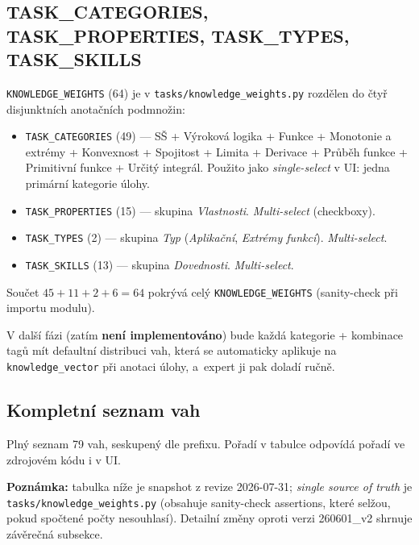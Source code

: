\documentclass[11pt,a4paper]{article}
\begin{document}
\subsection{TASK\_CATEGORIES, TASK\_PROPERTIES, TASK\_TYPES, TASK\_SKILLS}

\texttt{KNOWLEDGE\_WEIGHTS} (64) je v \texttt{tasks/knowledge\_weights.py} rozdělen do čtyř disjunktních anotačních podmnožin:

\begin{itemize}
  \item \texttt{TASK\_CATEGORIES} (49) --- SŠ + Výroková logika + Funkce + Monotonie a extrémy + Konvexnost + Spojitost + Limita + Derivace + Průběh funkce + Primitivní funkce + Určitý integrál. Použito jako \emph{single-select} v UI: jedna primární kategorie úlohy.
  \item \texttt{TASK\_PROPERTIES} (15) --- skupina \emph{Vlastnosti}. \emph{Multi-select} (checkboxy).
  \item \texttt{TASK\_TYPES} (2) --- skupina \emph{Typ} (\emph{Aplikační}, \emph{Extrémy funkcí}). \emph{Multi-select}.
  \item \texttt{TASK\_SKILLS} (13) --- skupina \emph{Dovednosti}. \emph{Multi-select}.
\end{itemize}

Součet $45 + 11 + 2 + 6 = 64$ pokrývá celý \texttt{KNOWLEDGE\_WEIGHTS} (sanity-check při importu modulu).

V další fázi (zatím \textbf{není implementováno}) bude každá kategorie + kombinace tagů mít defaultní distribuci vah, která se automaticky aplikuje na \texttt{knowledge\_vector} při anotaci úlohy, a~expert ji pak doladí ručně.

\subsection{Kompletní seznam vah}\label{sec:vahy-popis}

Plný seznam 79 vah, seskupený dle prefixu. Pořadí v tabulce odpovídá pořadí ve zdrojovém kódu i v UI.

\textbf{Poznámka:} tabulka níže je snapshot z revize 2026-07-31; \emph{single source of truth} je \texttt{tasks/knowledge\_weights.py} (obsahuje sanity-check assertions, které selžou, pokud spočtené počty nesouhlasí). Detailní změny oproti verzi 260601\_v2 shrnuje závěrečná subsekce.
\end{document}
